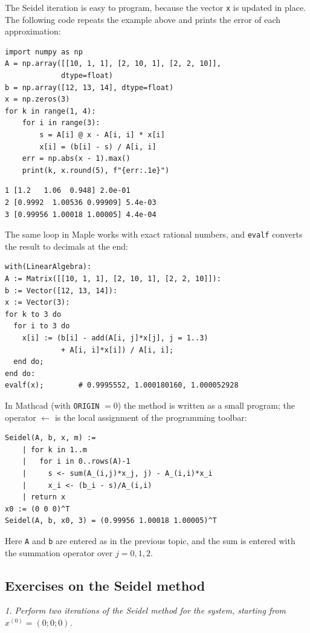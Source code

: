 The Seidel iteration is easy to program, because the vector \texttt{x} is
updated in place. The following code repeats the example above and prints
the error of each approximation:
\begin{Verbatim}[fontsize=\footnotesize,frame=single,label={\small Python}]
import numpy as np
A = np.array([[10, 1, 1], [2, 10, 1], [2, 2, 10]],
             dtype=float)
b = np.array([12, 13, 14], dtype=float)
x = np.zeros(3)
for k in range(1, 4):
    for i in range(3):
        s = A[i] @ x - A[i, i] * x[i]
        x[i] = (b[i] - s) / A[i, i]
    err = np.abs(x - 1).max()
    print(k, x.round(5), f"{err:.1e}")
\end{Verbatim}
\begin{Verbatim}[fontsize=\footnotesize,frame=single,label={\small Output}]
1 [1.2   1.06  0.948] 2.0e-01
2 [0.9992  1.00536 0.99909] 5.4e-03
3 [0.99956 1.00018 1.00005] 4.4e-04
\end{Verbatim}
The same loop in Maple works with exact rational numbers, and
\texttt{evalf} converts the result to decimals at the end:
\begin{Verbatim}[fontsize=\footnotesize,frame=single,label={\small Maple}]
with(LinearAlgebra):
A := Matrix([[10, 1, 1], [2, 10, 1], [2, 2, 10]]):
b := Vector([12, 13, 14]):
x := Vector(3):
for k to 3 do
  for i to 3 do
    x[i] := (b[i] - add(A[i, j]*x[j], j = 1..3)
             + A[i, i]*x[i]) / A[i, i];
  end do;
end do:
evalf(x);        # 0.9995552, 1.000180160, 1.000052928
\end{Verbatim}
In Mathcad (with \texttt{ORIGIN} $=0$) the method is written as a small
program; the operator $\leftarrow$ is the local assignment of the
programming toolbar:
\begin{Verbatim}[fontsize=\footnotesize,frame=single,label={\small Mathcad}]
Seidel(A, b, x, m) :=
    | for k in 1..m
    |   for i in 0..rows(A)-1
    |     s <- sum(A_(i,j)*x_j, j) - A_(i,i)*x_i
    |     x_i <- (b_i - s)/A_(i,i)
    | return x
x0 := (0 0 0)^T
Seidel(A, b, x0, 3) = (0.99956 1.00018 1.00005)^T
\end{Verbatim}
Here \texttt{A} and \texttt{b} are entered as in the previous topic, and the
sum is entered with the summation operator over $j=0,1,2$.

\subsection{Exercises on the Seidel method}

\emph{1. Perform two iterations of the Seidel method for the system, starting from $x^{(0)}=(0;0;0)$.}

